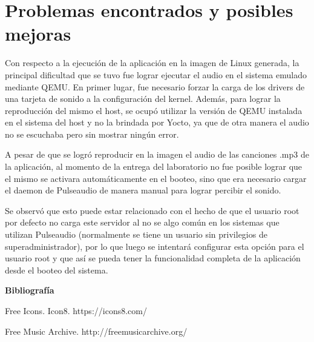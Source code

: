 \section{Problemas encontrados y posibles mejoras}
\label{sec:possible_fixes}
Con respecto a la ejecución de la aplicación en la imagen de Linux generada, la
principal dificultad que se tuvo fue lograr ejecutar el audio en el sistema
emulado mediante QEMU. En primer lugar, fue necesario forzar la carga de los
drivers de una tarjeta de sonido a la configuración del kernel. Además, para
lograr la reproducción del mismo el host, se ocupó utilizar la versión de QEMU
instalada en el sistema del host y no la brindada por Yocto, ya que de otra
manera el audio no se escuchaba pero sin mostrar ningún error.

A pesar de que se logró reproducir en la imagen el audio de las canciones .mp3 de la
aplicación, al momento de la entrega del laboratorio no fue posible lograr que
el mismo se activara automáticamente en el booteo, sino que era necesario
cargar el daemon de Pulseaudio de manera manual para lograr percibir el
sonido.

Se observó que esto puede estar relacionado con el hecho de que el
usuario root por defecto no carga este servidor al no se algo común en los
sistemas que utilizan Pulseaudio (normalmente se tiene un usuario sin
privilegios de superadministrador), por lo que luego se intentará configurar
esta opción para el usuario root y que así se pueda tener la funcionalidad
completa de la aplicación desde el booteo del sistema.




%


\textbf{ Bibliografía}

Free Icons. Icon8. https://icons8.com/

Free Music Archive. http://freemusicarchive.org/
%
%
